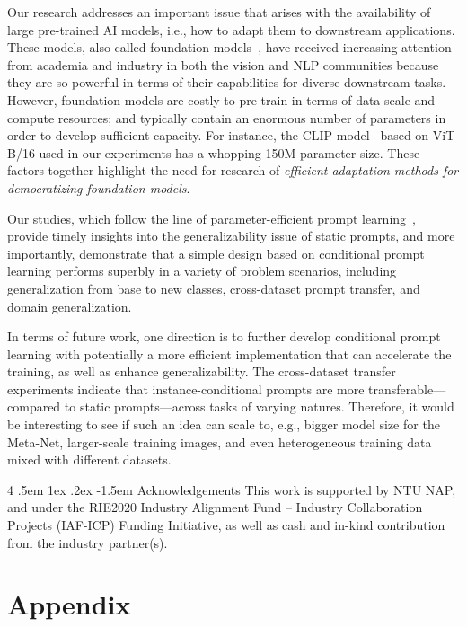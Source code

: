 \documentclass[10pt,twocolumn,letterpaper]{article}
\makeatletter
\renewcommand\paragraph{
  \@startsection{paragraph} {4} {\z@} {.5em \@plus1ex \@minus.2ex} {-1.5em} {\normalfont\normalsize\bfseries} }
\makeatother
\begin{document}
Our research addresses an important issue that arises with the availability of large pre-trained AI models, i.e., how to adapt them to downstream applications. These models, also called foundation models~\cite{bommasani2021opportunities}, have received increasing attention from academia and industry in both the vision and NLP communities because they are so powerful in terms of their capabilities for diverse downstream tasks. However, foundation models are costly to pre-train in terms of data scale and compute resources; and typically contain an enormous number of parameters in order to develop sufficient capacity. For instance, the CLIP model~\cite{radford2021learning} based on ViT-B/16 used in our experiments has a whopping 150M parameter size. These factors together highlight the need for research of \emph{efficient adaptation methods for democratizing foundation models}.

Our studies, which follow the line of parameter-efficient prompt learning~\cite{zhou2021coop}, provide timely insights into the generalizability issue of static prompts, and more importantly, demonstrate that a simple design based on conditional prompt learning performs superbly in a variety of problem scenarios, including generalization from base to new classes, cross-dataset prompt transfer, and domain generalization.

In terms of future work, one direction is to further develop conditional prompt learning with potentially a more efficient implementation that can accelerate the training, as well as enhance generalizability. The cross-dataset transfer experiments indicate that instance-conditional prompts are more transferable---compared to static prompts---across tasks of varying natures. Therefore, it would be interesting to see if such an idea can scale to, e.g., bigger model size for the Meta-Net, larger-scale training images, and even heterogeneous training data mixed with different datasets.

\paragraph{Acknowledgements}
This work is supported by NTU NAP, and under the RIE2020 Industry Alignment Fund – Industry Collaboration Projects (IAF-ICP) Funding Initiative, as well as cash and in-kind contribution from the industry partner(s).

\appendix
\section*{Appendix}
\end{document}

